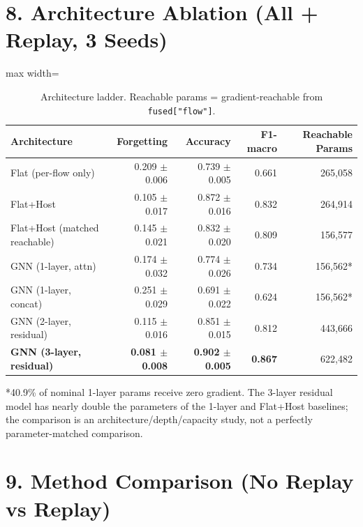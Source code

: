 \documentclass[11pt,a4paper]{article}
\begin{document}
\section*{8. Architecture Ablation (All + Replay, 3 Seeds)}

\begin{table}[H]
\centering
\caption{Architecture ladder. Reachable params = gradient-reachable from \texttt{fused["flow"]}.}
\label{tab:arch-ablation}
\begin{adjustbox}{max width=\textwidth}
\begin{tabular}{lrrrr}
\toprule
Architecture & Forgetting & Accuracy & F1-macro & Reachable Params \\
\midrule
Flat (per-flow only) & 0.209 $\pm$ 0.006 & 0.739 $\pm$ 0.005 & 0.661 & 265,058 \\
Flat+Host & 0.105 $\pm$ 0.017 & 0.872 $\pm$ 0.016 & 0.832 & 264,914 \\
Flat+Host (matched reachable) & 0.145 $\pm$ 0.021 & 0.832 $\pm$ 0.020 & 0.809 & 156,577 \\
GNN (1-layer, attn) & 0.174 $\pm$ 0.032 & 0.774 $\pm$ 0.026 & 0.734 & 156,562* \\
GNN (1-layer, concat) & 0.251 $\pm$ 0.029 & 0.691 $\pm$ 0.022 & 0.624 & 156,562* \\
GNN (2-layer, residual) & 0.115 $\pm$ 0.016 & 0.851 $\pm$ 0.015 & 0.812 & 443,666 \\
\textbf{GNN (3-layer, residual)} & \textbf{0.081 $\pm$ 0.008} & \textbf{0.902 $\pm$ 0.005} & \textbf{0.867} & 622,482 \\
\bottomrule
\end{tabular}
\end{adjustbox}
\end{table}
*40.9\% of nominal 1-layer params receive zero gradient. The 3-layer residual model has nearly double the parameters of the 1-layer and Flat+Host baselines; the comparison is an architecture/depth/capacity study, not a perfectly parameter-matched comparison.

\section*{9. Method Comparison (No Replay vs Replay)}
\end{document}
